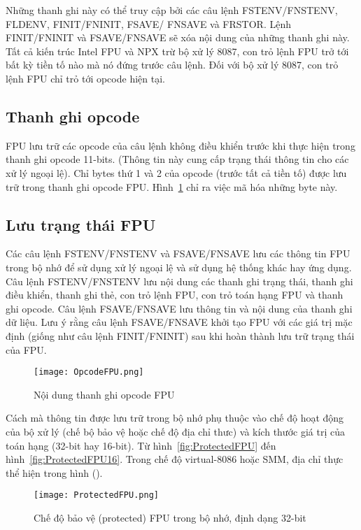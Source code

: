 	Những thanh ghi này có thể truy cập bởi các câu lệnh FSTENV/FNSTENV, FLDENV, FINIT/FNINIT, FSAVE/ FNSAVE và FRSTOR. Lệnh FINIT/FNINIT và FSAVE/FNSAVE sẽ xóa nội dung của những thanh ghi này.\\
	
	Tất cả kiến trúc Intel FPU và NPX trừ bộ xử lý 8087, con trỏ lệnh FPU trở tới bất kỳ tiền tố nào mà nó đứng trước câu lệnh. Đối với bộ xử lý 8087, con trỏ lệnh FPU chỉ trỏ tới opcode hiện tại.
	
 		\subsection*{Thanh ghi opcode}
	FPU lưu trữ các opcode của câu lệnh không điều khiển trước khi thực hiện trong thanh ghi opcode 11-bits. (Thông tin này cung cấp trạng thái thông tin cho các xử lý ngoại lệ). Chỉ bytes thứ 1 và 2 của opcode (trước tất cả tiền tố) được lưu trữ trong thanh ghi opcode FPU. Hình~\ref{fig:OpFPU} chỉ ra việc mã hóa những byte này.
	
		\subsection*{ Lưu trạng thái FPU}
	Các câu lệnh FSTENV/FNSTENV và FSAVE/FNSAVE lưu các thông tin FPU trong bộ nhớ để sử dụng xử lý ngoại lệ và sử dụng hệ thống khác hay ứng dụng. Câu lệnh FSTENV/FNSTENV lưu nội dung các thanh ghi trạng thái, thanh ghi điều khiển, thanh ghi thẻ, con trỏ lệnh FPU, con trỏ toán hạng FPU và thanh ghi opcode. Câu lệnh FSAVE/FNSAVE lưu thông tin và nội dung của thanh ghi dữ liệu. Lưu ý rằng câu lệnh FSAVE/FNSAVE khởi tạo FPU với các giá trị mặc định (giống như câu lệnh FINIT/FNINIT) sau khi hoàn thành lưu trữ trạng thái của FPU.
	\begin{center}
			\begin{figure}[htp]
				\begin{center}
					\texttt{[image: OpcodeFPU.png]}
				\end{center}
				\caption{Nội dung thanh ghi opcode FPU \protect\footnotemark}				
				\label{fig:OpFPU}				
			\end{figure}
		\end{center}	

	Cách mà thông tin được lưu trữ trong bộ nhớ phụ thuộc vào chế độ hoạt động của bộ xử lý (chế bộ bảo vệ hoặc chế độ địa chỉ thưc) và kích thước giá trị của toán hạng (32-bit hay 16-bit). Từ hình~\ref{fig:ProtectedFPU} đến hình~\ref{fig:ProtectedFPU16}. Trong chế độ virtual-8086 hoặc SMM, địa chỉ thực thể hiện trong hình ().
	\begin{center}
			\begin{figure}[htp]
				\begin{center}
					\texttt{[image: ProtectedFPU.png]}
				\end{center}
				\caption{Chế độ bảo vệ (protected) FPU trong bộ nhớ, định dạng 32-bit  \protect\footnotemark}				
				\label{fig:ProtectedFPU32}				
			\end{figure}
		\end{center}	

